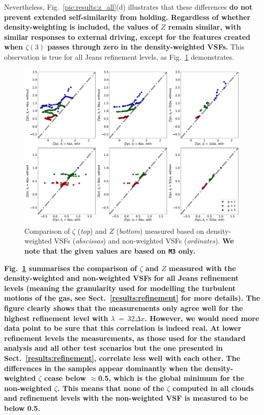 Nevertheless, Fig.~\ref{pic:results:z_all}(d) illustrates that these differences \textbf{do not prevent extended self-similarity from holding. 
Regardless of whether density-weighting is included, the values of $Z$ remain similar, with similar responses to external driving, except for the features created when $\zeta(3)$ passes through zero in the density-weighted VSFs.}
This observation is true for all Jeans refinement levels, as Fig.~\ref{pic:results:comp_weighting} demonstrates.


\begin{figure}
	\centering
    \includegraphics[width=\textwidth]{comp_weighting.pdf}
    \caption{ Comparison of $\zeta$ (\textit{top}) and $Z$ (\textit{bottom}) measured based on density-weighted VSFs (\textit{abscissas}) and non-weighted VSFs (\textit{ordinates}). \textbf{We note that the given values are based on \texttt{M3} only.}}
    \label{pic:results:comp_weighting}
\end{figure}

\textbf{Fig.~\ref{pic:results:comp_weighting} summarises the comparison of $\zeta$ and $Z$ measured with the density-weighted and non-weighted VSFs for all Jeans refinement levels (meaning the granularity used for modelling the turbulent motions of the gas, see Sect.~\ref{results:refinement} for more details).
The figure clearly shows that the measurements only agree well for the highest refinement level with $\lambda~=~32\Delta x$.
However, we would need more data point to be sure that this correlation is indeed real.
At lower refinement levels the measurements, as those used for the standard analysis and all other test scenarios but the one presented in Sect.~\ref{results:refinement}, correlate less well with each other. 
The differences in the samples appear dominantly when the density-weighted $\zeta$ cease below $\approx$0.5, which is the global minimum for the non-weighted $\zeta$. 
This means that none of the $\zeta$ computed in all clouds and refinement levels with the non-weighted VSF is measured to be below 0.5. }

